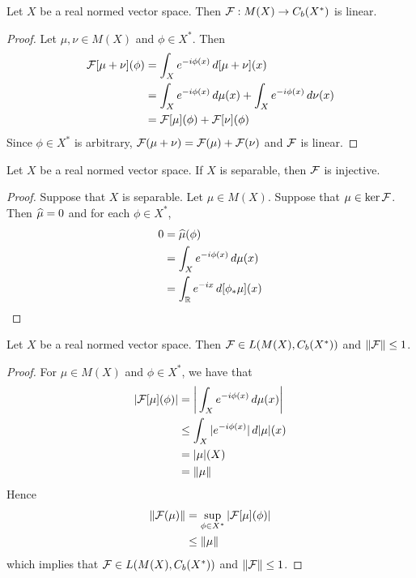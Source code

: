\documentclass{book}
\begin{document}
\begin{ex}
	Let $X$ be a real normed vector space. Then $\mathcal{F}: M(X) \rightarrow C_b(X^*)$ is linear.
\end{ex}

\begin{proof}
	Let $\mu, \nu \in M(X)$ and $\phi \in X^*$. Then 
	\begin{align*}
		\mathcal{F}[\mu + \nu](\phi) 
		& = \int_X e^{-i \phi(x)} \, d[\mu + \nu](x) \\
		& = \int_X e^{-i \phi(x)} \, d \mu(x) + \int_X e^{-i \phi(x)} \, d \nu(x) \\
		& = \mathcal{F}[\mu](\phi) + \mathcal{F}[\nu](\phi) 
	\end{align*}
	Since $\phi \in X^*$ is arbitrary, $\mathcal{F}(\mu + \nu) = \mathcal{F}(\mu) + \mathcal{F}(\nu)$ and $\mathcal{F}$ is linear.
\end{proof}

\begin{ex}
	Let $X$ be a real normed vector space. If $X$ is separable, then $\mathcal{F}$ is injective.  
\end{ex}

\begin{proof}
	Suppose that $X$ is separable. Let $\mu \in M(X)$. Suppose that $\mu \in \ker \mathcal{F}$. Then $\widehat{\mu} =0$ and for each $\phi \in X^*$, 
	\begin{align*}
		0 
		& = \widehat{\mu}(\phi) \\
		& = \int_X e^{-i \phi(x)} \, d \mu(x) \\
		& = \int_{\mathbb{R}} e^{-ix} \, d[\phi_*\mu](x)
	\end{align*}
	
\end{proof}

\begin{ex}
	Let $X$ be a real normed vector space. Then $\mathcal{F} \in L(M(X), C_b(X^*))$ and $\|\mathcal{F}\| \leq 1$.
\end{ex}

\begin{proof}
	For $\mu \in M(X)$ and $\phi \in X^*$, we have that 
	\begin{align*}
		|\mathcal{F}[\mu](\phi)|
		& =  \bigg| \int_X e^{-i \phi(x)} \, d \mu(x) \bigg| \\
		& \leq \int_X |e^{-i \phi(x)}| \, d|\mu|(x) \\
		& = |\mu|(X) \\
		& = \|\mu\|
	\end{align*}
	Hence 
	\begin{align*}
		\|\mathcal{F}(\mu)\| 
		& = \sup_{\phi \in X^*} |\mathcal{F}[\mu](\phi)| \\
		& \leq \|\mu\|
	\end{align*}
	which implies that $\mathcal{F} \in L(M(X), C_b(X^*))$ and $\|\mathcal{F}\| \leq 1$.
\end{proof}
\end{document}
